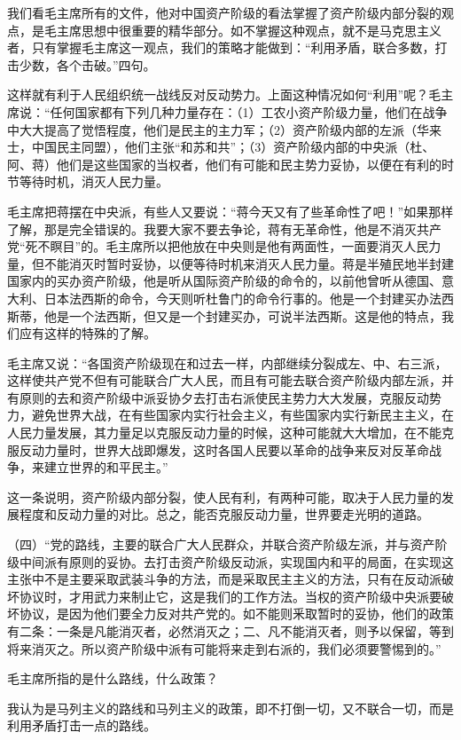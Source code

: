 我们看毛主席所有的文件，他对中国资产阶级的看法掌握了资产阶级内部分裂的观点，是毛主席思想中很重要的精华部分。如不掌握这种观点，就不是马克思主义者，只有掌握毛主席这一观点，我们的策略才能做到：“利用矛盾，联合多数，打击少数，各个击破。”四句。

这样就有利于人民组织统一战线反对反动势力。上面这种情况如何“利用”呢？毛主席说：“任何国家都有下列几种力量存在：（1）工农小资产阶级力量，他们在战争中大大提高了觉悟程度，他们是民主的主力军；（2）资产阶级内部的左派（华来士，中国民主同盟），他们主张“和苏和共”；（3）资产阶级内部的中央派（杜、阿、蒋）他们是这些国家的当权者，他们有可能和民主势力妥协，以便在有利的时节等待时机，消灭人民力量。

毛主席把蒋摆在中央派，有些人又要说：“蒋今天又有了些革命性了吧！”如果那样了解，那是完全错误的。我要大家不要去争论，蒋有无革命性，他是不消灭共产党“死不瞑目”的。毛主席所以把他放在中央则是他有两面性，一面要消灭人民力量，但不能消灭时暂时妥协，以便等待时机来消灭人民力量。蒋是半殖民地半封建国家内的买办资产阶级，他是听从国际资产阶级的命令的，以前他曾听从德国、意大利、日本法西斯的命令，今天则听杜鲁门的命令行事的。他是一个封建买办法西斯蒂，他是一个法西斯，但又是一个封建买办，可说半法西斯。这是他的特点，我们应有这样的特殊的了解。

毛主席又说：“各国资产阶级现在和过去一样，内部继续分裂成左、中、右三派，这样使共产党不但有可能联合广大人民，而且有可能去联合资产阶级内部左派，并有原则的去和资产阶级中派妥协夕去打击右派使民主势力大大发展，克服反动势力，避免世界大战，在有些国家内实行社会主义，有些国家内实行新民主主义，在人民力量发展，其力量足以克服反动力量的时候，这种可能就大大增加，在不能克服反动力量时，世界大战即爆发，这时各国人民要以革命的战争来反对反革命战争，来建立世界的和平民主。”

这一条说明，资产阶级内部分裂，使人民有利，有两种可能，取决于人民力量的发展程度和反动力量的对比。总之，能否克服反动力量，世界要走光明的道路。

（四）“党的路线，主要的联合广大人民群众，并联合资产阶级左派，并与资产阶级中间派有原则的妥协。去打击资产阶级反动派，实现国内和平的局面，在实现这主张中不是主要采取武装斗争的方法，而是采取民主主义的方法，只有在反动派破坏协议时，才用武力来制止它，这是我们的工作方法。当权的资产阶级中央派要破坏协议，是因为他们要全力反对共产党的。如不能则釆取暂时的妥协，他们的政策有二条：一条是凡能消灭者，必然消灭之；二、凡不能消灭者，则予以保留，等到将来消灭之。所以资产阶级中派有可能将来走到右派的，我们必须要警惕到的。”

毛主席所指的是什么路线，什么政策？

我认为是马列主义的路线和马列主义的政策，即不打倒一切，又不联合一切，而是利用矛盾打击一点的路线。

